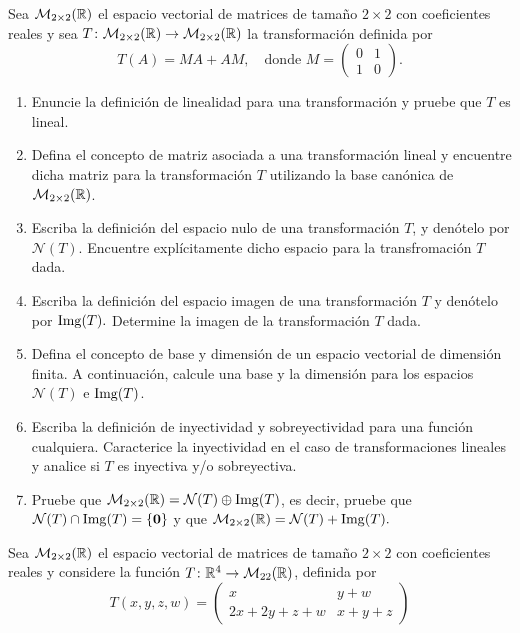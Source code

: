 \documentclass[10pt,respuestas,a4]{examenEPN}
\begin{document}
\encabezado

\begin{preguntas}

\item Sea $\mathcal M_{2\times 2}(\mathbb{R})$ el espacio vectorial de matrices de tamaño $2\times 2$ con coeficientes reales y sea $T\colon \mathcal M_{2\times 2}(\mathbb{R}) \rightarrow \mathcal M_{2\times 2}(\mathbb{R})$ la transformación definida por 
\[
T(A) = MA +AM,\quad \text{donde }M =\begin{pmatrix}0&1\\ 1&0\end{pmatrix}.
\]
\begin{enumerate}
    \item Enuncie la definición de linealidad para una transformación y pruebe que $T$ es lineal.
    \item Defina el concepto de matriz asociada a una transformación lineal y encuentre dicha matriz para la transformación $T$ utilizando la base canónica de $\mathcal M_{2\times 2}(\mathbb{R})$.
    \item Escriba la definición del espacio nulo de una transformación $T$, y denótelo por $\mathcal N(T).$ Encuentre explícitamente dicho espacio para la transfromación $T$ dada.
    \item Escriba la definición del espacio imagen de una transformación $T$ y denótelo por $\operatorname{Img}(T).$ Determine la imagen de la transformación $T$ dada.     
    \item Defina el concepto de base y dimensión de un espacio vectorial de dimensión finita. A continuación, calcule una base y la dimensión para los espacios $\mathcal N(T)$ e $\operatorname{Img}(T)$. 
    \item Escriba la definición de inyectividad y sobreyectividad para una función cualquiera. Caracterice la inyectividad en el caso de transformaciones lineales y analice si $T$ es inyectiva y/o sobreyectiva.
    \item Pruebe que $\mathcal M_{2\times 2}(\mathbb{R})=\mathcal N(T)\oplus\operatorname{Img}(T)$, es decir, pruebe que $\mathcal N(T)\cap\operatorname{Img}(T)=\{\mathbf 0\}$ y que $\mathcal M_{2\times 2}(\mathbb{R})=\mathcal N(T)+\operatorname{Img}(T).$
\end{enumerate}
\item Sea $\mathcal M_{2\times 2}(\mathbb{R})$ el espacio vectorial de matrices de tamaño $2\times 2$ con coeficientes reales y considere la función $T\colon \mathbb{R}^4 \rightarrow \mathcal M_{22}(\mathbb{R})$, definida por 
\[
T(x,y,z,w)= 
\begin{pmatrix}
x & y+w\\
2x+2y+z+w & x+y+z

\end{pmatrix}\]
\end{preguntas}
\end{document}
